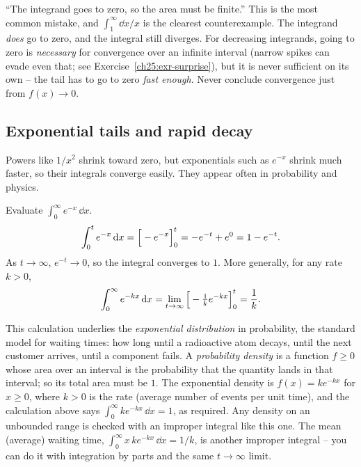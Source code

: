 \begin{trapbox}
``The integrand goes to zero, so the area must be finite.'' This is the most
common mistake, and $\int_1^\infty \dd x/x$ is the clearest counterexample. The integrand
\emph{does} go to zero, and the integral still diverges. For decreasing integrands,
going to zero is \emph{necessary} for convergence over an infinite interval (narrow
spikes can evade even that; see Exercise~\ref{ch25:exr-surprise}), but it is never
sufficient on its own -- the tail has to go to zero \emph{fast enough}.
Never conclude convergence just from $f(x)\to 0$.
\end{trapbox}

\subsection{Exponential tails and rapid decay}
\label{ch25:exp-tails}

Powers like $1/x^2$ shrink toward zero, but exponentials such as $e^{-x}$ shrink
much faster, so their integrals converge easily. They appear often in probability
and physics.

\begin{example}
\label{ch25:ex-exp}
Evaluate $\displaystyle\int_0^{\infty} e^{-x}\,\dd x$.
\[
  \int_0^{t} e^{-x}\,\mathrm{d} x
  = \Big[-e^{-x}\Big]_{0}^{t}
  = -e^{-t} + e^{0}
  = 1 - e^{-t}.
\]
As $t\to\infty$, $e^{-t}\to 0$, so the integral converges to $1$. More generally,
for any rate $k>0$,
\[
  \int_0^{\infty} e^{-kx}\,\mathrm{d} x
  = \lim_{t\to\infty}\Big[-\tfrac{1}{k}e^{-kx}\Big]_{0}^{t}
  = \frac{1}{k}.
\]
\end{example}

\begin{applicationbox}
This calculation underlies the \emph{exponential distribution} in probability, the
standard model for waiting times: how long until a radioactive atom decays, until
the next customer arrives, until a component fails. A \emph{probability density}
is a function $f \ge 0$ whose area over an interval is the probability that the
quantity lands in that interval; so its total area must be $1$. The exponential
density is $f(x) = k e^{-kx}$ for $x \ge 0$, where $k>0$ is the rate (average
number of events per unit time), and the calculation above says
$\int_0^\infty k e^{-kx}\,\dd x = 1$, as required. Any density on an unbounded
range is checked with an improper integral like this one.
The mean (average) waiting time, $\int_0^\infty x\,k e^{-kx}\,\dd x = 1/k$, is another
improper integral -- you can do it with integration by parts and the same
$t\to\infty$ limit.
\end{applicationbox}

